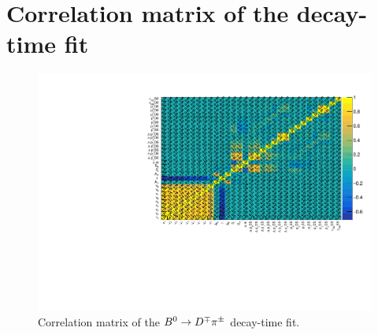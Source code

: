 \section[Correlation matrix of the $\Bz\to\Dmp\pipm$ decay-time fit]{Correlation matrix of the \boldmath{$\Bz\to\Dmp\pipm$} decay-time fit}
\label{app:corrMatrix}

\begin{figure}[h!]
        \begin{center}
                \includegraphics[width=1.15\linewidth, angle=-90]{AA-Appdx-corrMatrix/figs/sFit_CorrelationMatrix.pdf}
        \end{center}
        \vspace{-2mm}
        \caption{Correlation matrix of the $\Bz\to\Dmp\pipm$ decay-time fit.}
        \label{fig:timefitcorr}
\end{figure}
